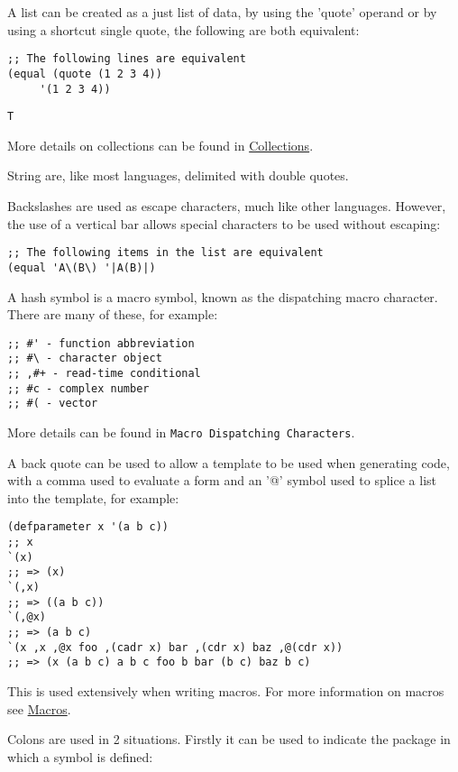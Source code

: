 \documentclass[11pt]{article}
\begin{document}
A list can be created as a just list of data, by using the 'quote'
operand or by using a shortcut single quote, the following are both
equivalent:

\begin{verbatim}
;; The following lines are equivalent
(equal (quote (1 2 3 4))
     '(1 2 3 4))
\end{verbatim}
\begin{verbatim}
T
\end{verbatim}

More details on collections can be found in \hyperref[sec-4]{Collections}.

String are, like most languages, delimited with double quotes.

Backslashes are used as escape characters, much like other
languages. However, the use of a vertical bar allows special
characters to be used without escaping:

\begin{verbatim}
;; The following items in the list are equivalent
(equal 'A\(B\) '|A(B)|)
\end{verbatim}
A hash symbol is a macro symbol, known as the dispatching macro
character. There are many of these, for example:

\begin{verbatim}
;; #' - function abbreviation
;; #\ - character object
;; ,#+ - read-time conditional
;; #c - complex number
;; #( - vector
\end{verbatim}

More details can be found in \texttt{Macro Dispatching Characters}.

A back quote can be used to allow a template to be used when
generating code, with a comma used to evaluate a form and an '@'
symbol used to splice a list into the template, for example:

\begin{verbatim}
(defparameter x '(a b c))
;; x
`(x)
;; => (x)
`(,x)
;; => ((a b c))
`(,@x)
;; => (a b c)
`(x ,x ,@x foo ,(cadr x) bar ,(cdr x) baz ,@(cdr x))
;; => (x (a b c) a b c foo b bar (b c) baz b c)
\end{verbatim}


This is used extensively when writing macros. For more information
on macros see \hyperref[sec-10]{Macros}.

Colons are used in 2 situations. Firstly it can be used to indicate
the package in which a symbol is defined:
\end{document}
